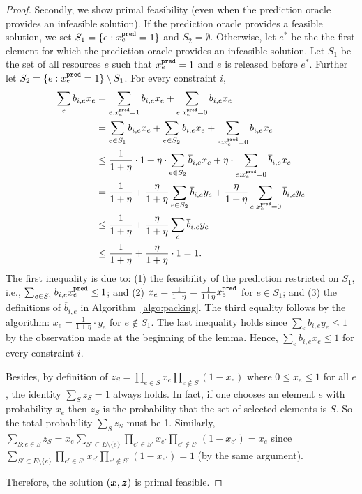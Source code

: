 \begin{proof}
Secondly, we show primal feasibility (even when the prediction oracle provides an infeasible solution).
If the prediction oracle provides a feasible solution, we set $S_1=\{e: x^{\texttt{pred}}_e=1\}$ and $S_2=\emptyset$.
Otherwise, let $e^{*}$ be the the first element for which the prediction oracle provides an infeasible solution. 
Let $S_{1}$ be the set of all resources $e$ such that $x^{\texttt{pred}}_{e} = 1$ and $e$ is released before $e^{*}$.
Further let
$S_{2} = \{e: x^{\texttt{pred}}_{e} = 1\} \setminus S_{1}$.
For every constraint $i$, 
\begin{align*}
\sum_{e} b_{i,e} x_{e} 
&= \sum_{e: x^{\pred}_{e} = 1} b_{i,e} x_{e} +  \sum_{e: x^{\pred}_{e} = 0} b_{i,e} x_{e} \\
%
&= \sum_{e \in S_{1}}  b_{i,e} x_{e} +  \sum_{e \in S_{2}} b_{i,e} x_{e}  +   \sum_{e: x^{\pred}_{e} = 0} b_{i,e} x_{e} \\
%
&\leq \frac{1}{1+\eta} \cdot 1
+ \eta \cdot \sum_{e \in S_{2}} \overline{b}_{i,e} x_{e} 
+ \eta \cdot \sum_{e: x^{\pred}_{e} = 0} \overline{b}_{i,e} x_{e} \\
%
&= \frac{1}{1+\eta}  
+ \frac{\eta}{1+\eta}  \sum_{e \in S_{2}} \overline{b}_{i,e} y_{e} 
+ \frac{\eta}{1+\eta}  \sum_{e: x^{\pred}_{e} = 0} \overline{b}_{i,e} y_{e} \\
%
&\leq \frac{1}{1+\eta}
+ \frac{\eta}{1+\eta}  \sum_{e} \overline{b}_{i,e} y_{e} \\
%
&\leq \frac{1}{1+\eta}
+ \frac{\eta}{1+\eta}  \cdot 1 = 1.
\end{align*}
%
The first inequality is due to: (1) the feasibility of the prediction restricted on $S_{1}$, i.e., 
$\sum_{e \in S_{1}} b_{i,e} x^{\texttt{pred}}_{e} \leq 1$; and (2) 
$x_{e} = \frac{1}{1 + \eta} = \frac{1}{1 + \eta} x^{\texttt{pred}}_{e}$
for $e \in S_{1}$; and (3) the definitions of $\overline{b}_{i,e}$ in Algorithm~\ref{algo:packing}.
The third equality follows by the algorithm: 
$x_{e} = \frac{1}{1 + \eta} \cdot y_{e}$
for $e \notin S_{1}$. 
The last inequality holds since $\sum_{e} \overline{b}_{i,e} y_{e} \leq 1$ by the observation made at the beginning of the lemma.
Hence, $\sum_{e} b_{i,e} x_{e} \leq 1$ for every constraint $i$.

Besides, by definition of $z_{S} = \prod_{e \in S} x_{e} \prod_{e \notin S} (1 - x_{e})$
where $0 \leq x_{e} \leq 1$ for all $e$, the identity $\sum_{S} z_{S} = 1$ always holds. 
In fact, if one chooses an element $e$ with probability $x_{e}$ then $z_{S}$ is the 
probability that the set of selected elements is $S$. So the total probability $\sum_{S} z_{S}$ must be 1.
Similarly, 
$\sum_{S: e \in S} z_{S} = x_{e} \sum_{S' \subset E \setminus \{e\}} \prod_{e' \in S'} x_{e'} \prod_{e' \notin S'} (1 - x_{e'}) = x_{e}$
since $\sum_{S' \subset E \setminus \{e\}} \prod_{e' \in S'} x_{e'} \prod_{e' \notin S'} (1 - x_{e'}) = 1$ (by the same argument). 

Therefore, the solution $(\bm{x}, \bm{z})$ is primal feasible.
\end{proof}

